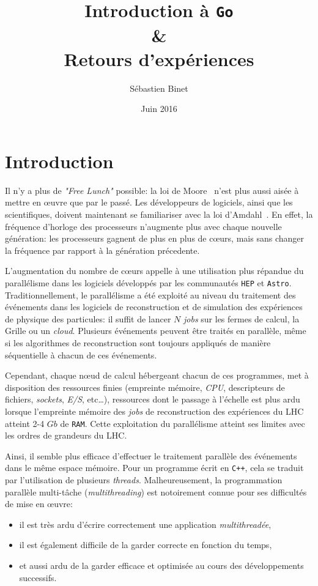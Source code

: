 \documentclass[a4paper,french]{article}
\title{Introduction \`a \texttt{Go}\\ \&\\ Retours d'exp\'eriences}
\author{S\'ebastien Binet}
\date{Juin 2016}
\affil{CNRS/IN2P3/LPC}
\begin{document}
\maketitle

\section{Introduction}

Il n'y a plus de \emph{"Free Lunch"} possible: la loi de Moore~\cite{ref-moore}
n'est plus aussi ais\'ee \`a mettre en {\oe}uvre que par le pass\'e.
Les d\'eveloppeurs de logiciels, ainsi que les scientifiques, doivent maintenant
se familiariser avec la loi d'Amdahl~\cite{ref-amdahl}.
En effet, la fr\'equence d'horloge des processeurs n'augmente plus avec chaque
nouvelle g\'en\'eration: les processeurs gagnent de plus en plus de c\oe urs,
mais sans changer la fr\'equence par rapport \`a la g\'en\'eration
pr\'ecedente.

L'augmentation du nombre de c\oe urs appelle \`a une utilisation plus
r\'epandue du parall\'elisme dans les logiciels d\'evelopp\'es par les
communaut\'es \texttt{HEP} et \texttt{Astro}.
Traditionnellement, le parall\'elisme a \'et\'e exploit\'e au niveau du
traitement des \'ev\'enements dans les logiciels de reconstruction et de
simulation des exp\'eriences de physique des particules: il suffit de lancer $N$
\emph{jobs} sur les fermes de calcul, la Grille ou un \emph{cloud}.
Plusieurs \'ev\'enements peuvent \^etre trait\'es en parall\`ele, m\^eme si les
algorithmes de reconstruction sont toujours appliqu\'es de mani\`ere
s\'equentielle \`a chacun de ces \'ev\'enements.

Cependant, chaque n\oe ud de calcul h\'ebergeant chacun de ces programmes, met \`a
disposition des ressources finies (empreinte m\'emoire, \emph{CPU}, descripteurs
de fichiers, \emph{sockets}, \emph{E/S}, etc\ldots), ressources dont le passage \`a
l'\'echelle est plus ardu lorsque l'empreinte m\'emoire des \emph{jobs} de
reconstruction des exp\'eriences du LHC atteint 2-4 $Gb$ de \texttt{RAM}.
Cette exploitation du parall\'elisme atteint ses limites avec les
ordres de grandeurs du LHC.

Ainsi, il semble plus efficace d'effectuer le traitement parall\`ele des
\'ev\'enements dans le m\^eme espace m\'emoire.
Pour un programme \'ecrit en \texttt{C++}, cela se traduit par l'utilisation de
plusieurs \emph{threads}.
Malheureusement, la programmation parall\`ele multi-t\^ache
(\emph{multithreading}) est notoirement connue pour ses difficult\'es de mise en
\oe uvre:
\begin{itemize}
	\item il est tr\`es ardu d'\'ecrire correctement une application \emph{multithread\'ee},
	\item il est \'egalement difficile de la garder correcte en fonction du
		temps,
	\item et aussi ardu de la garder efficace et optimis\'ee au cours des
		d\'eveloppements successifs.
\end{itemize}
\end{document}
